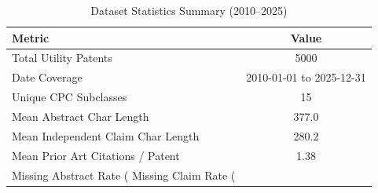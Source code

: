 \begin{table}
\caption{Dataset Statistics Summary (2010--2025)}
\label{tab:dataset_stats}
\begin{tabular}{lc}
\toprule
Metric & Value \\
\midrule
Total Utility Patents & 5000 \\
Date Coverage & 2010-01-01 to 2025-12-31 \\
Unique CPC Subclasses & 15 \\
Mean Abstract Char Length & 377.0 \\
Mean Independent Claim Char Length & 280.2 \\
Mean Prior Art Citations / Patent & 1.38 \\
Missing Abstract Rate (%
Missing Claim Rate (%
\bottomrule
\end{tabular}
\end{table}
